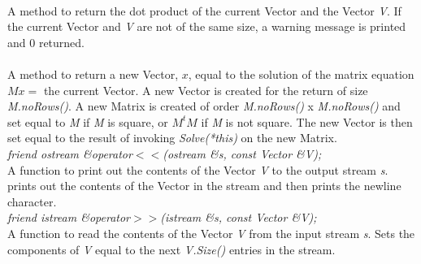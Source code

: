  \\
A method to return the dot product of the current Vector and the
Vector {\em V}. If the current Vector and {\em V} are not of the same
size, a warning message is printed and $0$ returned. \\ 

 \\
A method to return a new Vector, $x$, equal to the solution of the
matrix equation $Mx=$ the current Vector. A new Vector is created for
the return of size {\em M.noRows()}. A new Matrix is created of order
{\em M.noRows()} x {\em M.noRows()} and set equal to {\em M} if {\em
M} is square, or $M^tM$ if {\em M} is not square. The new Vector is
then set equal to the result of invoking {\em Solve(*this)} on the new
Matrix. \\ 

{\em friend ostream \&operator$<<$(ostream \&s, const Vector \&V);} \\
A function to print out the contents of the Vector {\em V} to the
output stream {\em s}. prints out the contents of the Vector in the
stream and then prints the newline character. \\

{\em friend istream \&operator$>>$(istream \&s, const Vector \&V);} \\
A function to read the contents of the Vector {\em V} from the input
stream {\em s}. Sets the components of {\em V} equal to the next {\em
V.Size()} entries in the stream.\\ 





